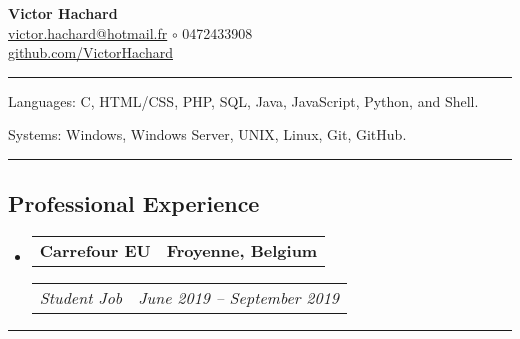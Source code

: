 \documentclass[10pt,letterpaper]{article}
\makeatletter
\newenvironment{indentsection}[1]
{\begin{list}{}
  {\setlength{\leftmargin}{#1}} \item[]
}
{\end{list}}
\newcommand{\headerrow}[2]
{\begin{tabular*}{\linewidth}{l@{\extracolsep{\fill}}r}
  #1 &
  #2 \\
\end{tabular*}}
\makeatother
\begin{document}
\begin{center}
  \huge \textbf{Victor Hachard} \\
  \large
  \href{mailto:victor.hachard@hotmail.fr}{victor.hachard@hotmail.fr}
  $\circ$
  0472433908
  \\
  \href{http://www.github.com/VictorHachard}{github.com/VictorHachard}
  \vspace{-0.2em}
\end{center}


\hrule
\begin{indentsection}{\parindent}
\begin{description*}
  \item[Languages:] C, HTML/CSS, PHP, SQL, Java, JavaScript, Python, and Shell.
  \item[Systems:] Windows, Windows Server, UNIX, Linux, Git, GitHub.
\end{description*}
\end{indentsection}


\hrule
\vspace{-0.4em}
\subsection*{Professional Experience}
\begin{itemize}
  \parskip=0.1em

  \item
  \headerrow
    {\textbf{Carrefour EU}}
    {\textbf{Froyenne, Belgium}}
  \headerrow
    {\emph{Student Job}}
    {\emph{June 2019 -- September 2019}}
  \end{itemize}


\hrule
\vspace{-0.4em}
\end{document}

